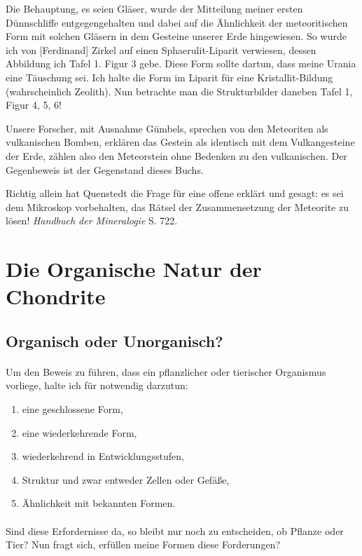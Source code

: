 \documentclass[a4paper, 12pt, oneside]{article}
\begin{document}
Die Behauptung, es seien Gläser, wurde der Mitteilung meiner ersten Dünnschliffe entgegengehalten und dabei auf die Ähnlichkeit der meteoritischen Form mit solchen Gläsern in dem Gesteine unserer Erde hingewiesen. So wurde ich von [Ferdinand] Zirkel auf einen Sphaerulit-Liparit verwiesen, dessen Abbildung ich Tafel 1. Figur 3 gebe. Diese Form sollte dartun, dass meine Urania eine Täuschung sei. Ich halte die Form im Liparit für eine Kristallit-Bildung (wahrscheinlich Zeolith). Nun betrachte man die Strukturbilder daneben Tafel 1, Figur 4, 5, 6!

Unsere Forscher, mit Ausnahme Gümbels, sprechen von den Meteoriten als vulkanischen Bomben, erklären das Gestein als identisch mit dem Vulkangesteine der Erde, zählen also den Meteorstein ohne Bedenken zu den vulkanischen. Der Gegenbeweis ist der Gegenstand dieses Buchs.

Richtig allein hat Quenstedt die Frage für eine offene erklärt und gesagt: es sei dem Mikroskop vorbehalten, das Rätsel der Zusammensetzung der Meteorite zu lösen! \emph{Handbuch der Mineralogie} S. 722.
\clearpage
\section{Die Organische Natur der Chondrite}
\subsection{Organisch oder Unorganisch?}
\paragraph{}
Um den Beweis zu führen, dass ein pflanzlicher oder tierischer Organismus vorliege, halte ich für notwendig darzutun:
\begin{enumerate}
    \item eine geschlossene Form,
    \item eine wiederkehrende Form,
    \item wiederkehrend in Entwicklungsstufen,
    \item Struktur und zwar entweder Zellen oder Gefäße,
    \item Ähnlichkeit mit bekannten Formen.
\end{enumerate}
\paragraph{}
Sind diese Erfordernisse da, so bleibt nur noch zu entscheiden, ob Pflanze oder Tier? Nun fragt sich, erfüllen meine Formen diese Forderungen?
\end{document}
